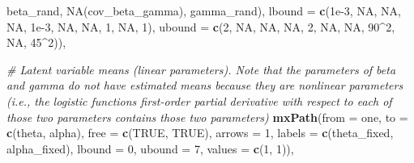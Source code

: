 \documentclass[
12pt, %
twoside,
english]{guelphthesis}
\newenvironment{Shaded}{\begin{snugshade}}{\end{snugshade}}
\newcommand{\AttributeTok}[1]{\textcolor[rgb]{0.13,0.29,0.53}{#1}}
\newcommand{\CommentTok}[1]{\textcolor[rgb]{0.56,0.35,0.01}{\textit{#1}}}
\newcommand{\ConstantTok}[1]{\textcolor[rgb]{0.56,0.35,0.01}{#1}}
\newcommand{\DecValTok}[1]{\textcolor[rgb]{0.00,0.00,0.81}{#1}}
\newcommand{\FloatTok}[1]{\textcolor[rgb]{0.00,0.00,0.81}{#1}}
\newcommand{\FunctionTok}[1]{\textcolor[rgb]{0.13,0.29,0.53}{\textbf{#1}}}
\newcommand{\NormalTok}[1]{#1}
\newcommand{\SpecialCharTok}[1]{\textcolor[rgb]{0.81,0.36,0.00}{\textbf{#1}}}
\newcommand{\StringTok}[1]{\textcolor[rgb]{0.31,0.60,0.02}{#1}}
\begin{document}
\begin{Shaded}
\begin{Highlighting}[numbers=left,,]
                  \StringTok{\textquotesingle{}beta\_rand\textquotesingle{}}\NormalTok{, }\StringTok{\textquotesingle{}NA(cov\_beta\_gamma)\textquotesingle{}}\NormalTok{, }
                  \StringTok{\textquotesingle{}gamma\_rand\textquotesingle{}}\NormalTok{), }
         \AttributeTok{lbound =} \FunctionTok{c}\NormalTok{(}\FloatTok{1e{-}3}\NormalTok{, }\ConstantTok{NA}\NormalTok{, }\ConstantTok{NA}\NormalTok{, }\ConstantTok{NA}\NormalTok{, }
                    \FloatTok{1e{-}3}\NormalTok{, }\ConstantTok{NA}\NormalTok{, }\ConstantTok{NA}\NormalTok{, }
                    \DecValTok{1}\NormalTok{, }\ConstantTok{NA}\NormalTok{,}
                    \DecValTok{1}\NormalTok{), }
         \AttributeTok{ubound =} \FunctionTok{c}\NormalTok{(}\DecValTok{2}\NormalTok{, }\ConstantTok{NA}\NormalTok{, }\ConstantTok{NA}\NormalTok{, }\ConstantTok{NA}\NormalTok{, }
                    \DecValTok{2}\NormalTok{, }\ConstantTok{NA}\NormalTok{, }\ConstantTok{NA}\NormalTok{, }
                    \DecValTok{90}\SpecialCharTok{\^{}}\DecValTok{2}\NormalTok{, }\ConstantTok{NA}\NormalTok{, }
                    \DecValTok{45}\SpecialCharTok{\^{}}\DecValTok{2}\NormalTok{)),}
  
  \CommentTok{\# Latent variable means (linear parameters). Note that the parameters of beta and gamma do not have estimated means because they are nonlinear parameters (i.e., the logistic function\textquotesingle{}s first{-}order partial derivative with respect to each of those two parameters contains those two parameters)}
  \FunctionTok{mxPath}\NormalTok{(}\AttributeTok{from =} \StringTok{\textquotesingle{}one\textquotesingle{}}\NormalTok{, }\AttributeTok{to =} \FunctionTok{c}\NormalTok{(}\StringTok{\textquotesingle{}theta\textquotesingle{}}\NormalTok{, }\StringTok{\textquotesingle{}alpha\textquotesingle{}}\NormalTok{), }\AttributeTok{free =} \FunctionTok{c}\NormalTok{(}\ConstantTok{TRUE}\NormalTok{, }\ConstantTok{TRUE}\NormalTok{), }\AttributeTok{arrows =} \DecValTok{1}\NormalTok{,}
         \AttributeTok{labels =} \FunctionTok{c}\NormalTok{(}\StringTok{\textquotesingle{}theta\_fixed\textquotesingle{}}\NormalTok{, }\StringTok{\textquotesingle{}alpha\_fixed\textquotesingle{}}\NormalTok{), }\AttributeTok{lbound =} \DecValTok{0}\NormalTok{, }\AttributeTok{ubound =} \DecValTok{7}\NormalTok{, }
         \AttributeTok{values =} \FunctionTok{c}\NormalTok{(}\DecValTok{1}\NormalTok{, }\DecValTok{1}\NormalTok{)),}
  

\end{Highlighting}
\end{Shaded}
\end{document}
